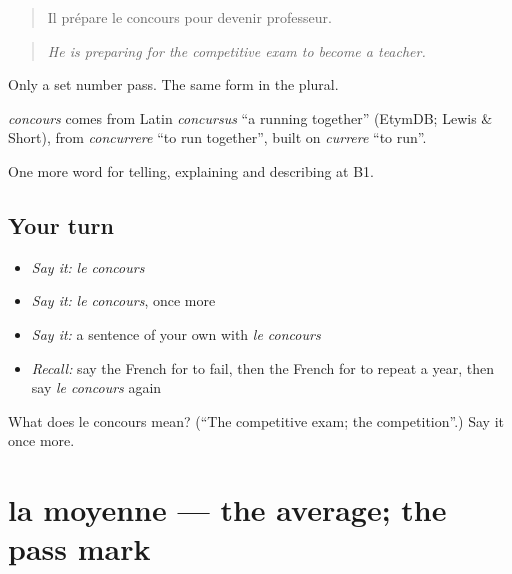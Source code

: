 \begin{quote}
Il prépare le concours pour devenir professeur.
\end{quote}

\begin{quote}
\emph{He is preparing for the competitive exam to become a teacher.}
\end{quote}

Only a set number pass. The same form in the plural.

\begin{cousinweb}
\emph{concours} comes from Latin \emph{concursus} \textquotedblleft{}a running together\textquotedblright{} (EtymDB; Lewis \& Short), from \emph{concurrere} \textquotedblleft{}to run together\textquotedblright{}, built on \emph{currere} \textquotedblleft{}to run\textquotedblright{}.
\end{cousinweb}

\begin{grammarlens}[title={What you've built}]
One more word for telling, explaining and describing at B1.
\end{grammarlens}

\subsection*{Your turn}
\begin{itemize}
\raggedright
  \item \emph{Say it:} \emph{le concours}
  \item \emph{Say it:} \emph{le concours}, once more
  \item \emph{Say it:} a sentence of your own with \emph{le concours}
  \item \emph{Recall:} say the French for to fail, then the French for to repeat a year, then say \emph{le concours} again
\end{itemize}

\begin{tcolorbox}[breakable,colback=teal!4,colframe=teal!35!black,title={Before you move on}]
What does le concours mean? (\textquotedblleft{}The competitive exam; the competition\textquotedblright{}.) Say it once more.
\end{tcolorbox}
\section[la moyenne]{la moyenne — the average; the pass mark}

\label{lesson:FR-C378-moyenne}



